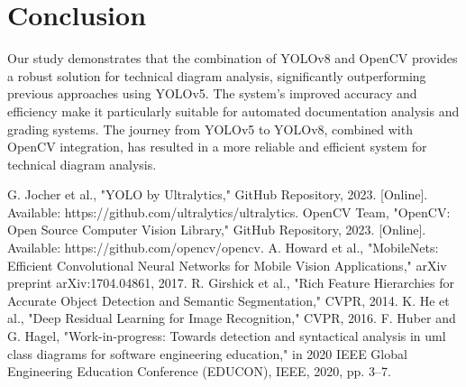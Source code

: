\documentclass[conference]{IEEEtran}
\begin{document}
\section{Conclusion}
Our study demonstrates that the combination of YOLOv8 and OpenCV provides a robust solution for technical diagram analysis, significantly outperforming previous approaches using YOLOv5. The system's improved accuracy and efficiency make it particularly suitable for automated documentation analysis and grading systems. The journey from YOLOv5 to YOLOv8, combined with OpenCV integration, has resulted in a more reliable and efficient system for technical diagram analysis.

\begin{thebibliography}{00}
 G. Jocher et al., "YOLO by Ultralytics," GitHub Repository, 2023. [Online]. Available: https://github.com/ultralytics/ultralytics.
 OpenCV Team, "OpenCV: Open Source Computer Vision Library," GitHub Repository, 2023. [Online]. Available: https://github.com/opencv/opencv.
 A. Howard et al., "MobileNets: Efficient Convolutional Neural Networks for Mobile Vision Applications," arXiv preprint arXiv:1704.04861, 2017.
 R. Girshick et al., "Rich Feature Hierarchies for Accurate Object Detection and Semantic Segmentation," CVPR, 2014.
 K. He et al., "Deep Residual Learning for Image Recognition," CVPR, 2016.
 F. Huber and G. Hagel, "Work-in-progress: Towards detection and syntactical analysis in uml class diagrams for software engineering education," in 2020 IEEE Global Engineering Education Conference (EDUCON), IEEE, 2020, pp. 3--7.
\end{thebibliography}
\vspace{12pt}
\end{document}
